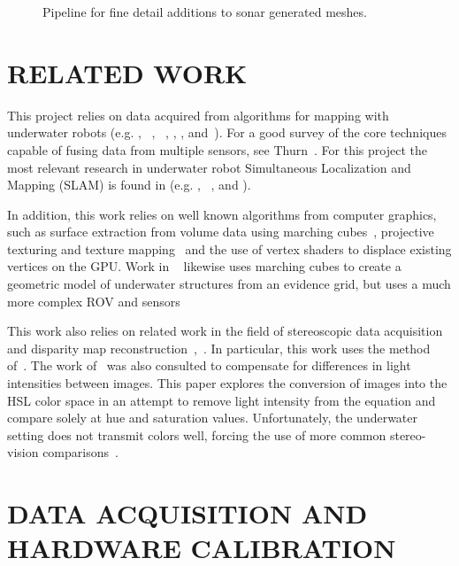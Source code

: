 \documentclass[a4paper,twoside]{article}
\begin{document}
\begin{figure*}[!ht]
  \vspace{-0.2cm}
  \caption{Pipeline for fine detail additions to sonar generated meshes.}
 \label{fig:systemblock}
\end{figure*}

\section{\uppercase{Related Work}}
\label{sec:data}

This project relies on data acquired from algorithms for mapping with underwater robots (e.g. \cite{Williams2000}, ~\cite{Williams09}, ~\cite{opizarro-2009a}, \cite{Fairfield2005,Fairfield2006}, \cite{Clark2008b}, and~\cite{White10}). For a good survey of the core techniques capable of fusing data from multiple sensors, see Thurn~\cite{Thrun2005}.
For this project the most relevant  research in underwater robot Simultaneous Localization and Mapping (SLAM) is found in (e.g. \cite{Williams2000}, ~\cite{harbor}, and \cite{Fairfield2005,Fairfield2006}).  

In addition, this work relies on well known algorithms from computer graphics, such as surface extraction from volume data using marching cubes~\cite{Lorensen}, projective texturing and texture mapping~\cite{Williams78castingcurved,Segal} and the use of vertex shaders to displace existing vertices on the GPU. Work in ~\cite{Fairfield:2010} likewise uses marching cubes to create a geometric model of underwater structures from an evidence grid, but uses a much more complex ROV and sensors

This work also relies on related work in the field of stereoscopic data acquisition and disparity map reconstruction~\cite{stereo:gutMarroquin},~\cite{stereo:scharsteinSzeliski}.
  In particular, this work uses the method of~\cite{stereo:zitKan}.
  The work of~\cite{stereo:nalGast} was also consulted to compensate for differences in light intensities between images.
  This paper explores the conversion of images into the HSL color space in an attempt to remove light intensity from the equation and compare solely at hue and saturation values.
  Unfortunately, the underwater setting does not transmit colors well, forcing the use of more common stereo-vision comparisons~\cite{stereo:nalpantidis2008review}. 

\section{\uppercase{Data Acquisition and Hardware Calibration}}
\label{sec:data}
\end{document}
